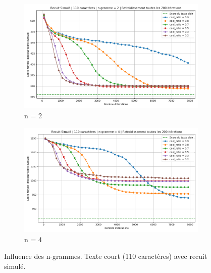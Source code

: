 \documentclass[a4paper]{article}
\begin{document}
\begin{figure}[H]
    \centering
    \begin{subfigure}[b]{0.49\textwidth}
        \includegraphics[width=\textwidth]{graphe_recuit_n_2_110_cool_time_200.png}
        \caption{n = 2}
        \label{fig:n2-110-200}
    \end{subfigure}
    \hfill
    \begin{subfigure}[b]{0.49\textwidth}
        \includegraphics[width=\textwidth]{graphe_recuit_n_4_110_cool_time_200.png}
        \caption{n = 4}
        \label{fig:n4-110-200}
    \end{subfigure}
    \caption{Influence des n-grammes. Texte court (110 caractères) avec recuit simulé.}
    \label{fig:rs-n2-n4-110}
\end{figure}
\end{document}

